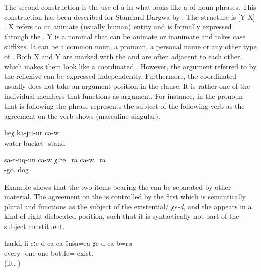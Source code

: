 The second construction is the use of a  in what looks like a  of noun phrases. This construction has been described for Standard Dargwa by \citet{vandenBerg2004}. The structure is [Y X] . X refers to an animate (usually human) entity and is formally expressed through the . Y is a nominal that can be animate or inanimate and takes case suffixes. It can be a common noun, a pronoun, a personal name or any other type of . Both X and Y are marked with the   and are often adjacent to each other, which makes them look like a coordinated . However, the argument referred to by the reflexive can be expressed independently. Furthermore, the coordinated  usually does not take an argument position in the clause. It is rather one of the individual members that functions as argument. For instance, in  the pronoun  that is following the  phrase represents the subject of the following verb as the agreement on the verb shows (masculine singular).
%
\begin{exe}
	\ex	\label{ex:‎‎With a bucket of water he is standing}
	\gll	[hin-na	badra=ra	ca-w=ra]	heχ	ka-jcː-ur	ca-w\\
		water	bucket			-stand	\\
	\glt	{}

	\ex	\label{ex:He ran away with his dog}
	\gll	sa-r-uq-un	ca-w	χːʷe=ra	ca-w=ra\\
		-go.		dog	\\
	\glt	{}
\end{exe}

Example  shows that the two items bearing the   can be separated by other material. The agreement on the  is controlled by the first   which is semantically plural and functions as the  subject of the existential\slash {} \textit{χe-d}, and the  appears in a kind of right-dislocated position, such that it is syntactically not part of the subject constituent. 
%
\begin{exe}
	\ex	\label{ex:‎Everybody is with a bottle in their hands. (lit. There is one bottle each in everybody's (hand), and they also.)}
	\gll	harkil-li-cːe-d	ca	ca	šuša=ra	χe-d	ca-b=ra\\
		every-	one	one bottle=	exist.		\\
	\glt	{} (lit. )
\end{exe}
%

